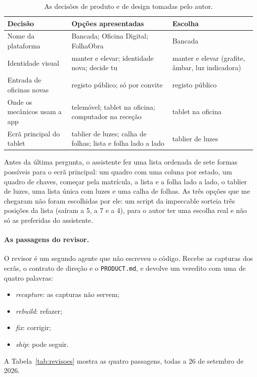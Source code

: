\documentclass[a4paper,12pt]{article}
\begin{document}
\begin{table}[htbp]
\centering
\small
\begin{tabularx}{\textwidth}{@{}>{\raggedright\arraybackslash}p{3.2cm}LL@{}}
\toprule
\textbf{Decisão} & \textbf{Opções apresentadas} & \textbf{Escolha} \\
\midrule
Nome da plataforma & Bancada; Oficina Digital; FolhaObra & Bancada \\
Identidade visual & manter e elevar; identidade nova; decide tu & manter e elevar (grafite, âmbar, luz indicadora) \\
Entrada de oficinas novas & registo público; só por convite & registo público \\
Onde os mecânicos usam a app & telemóvel; tablet na oficina; computador na receção & tablet na oficina \\
Ecrã principal do tablet & tablier de luzes; calha de folhas; lista e folha lado a lado & tablier de luzes \\
\bottomrule
\end{tabularx}
\caption{As decisões de produto e de design tomadas pelo autor.}
\label{tab:decisoes}
\end{table}

Antes da última pergunta, o assistente fez uma lista ordenada de sete formas possíveis para o ecrã principal: um quadro com uma coluna por estado, um quadro de chaves, começar pela matrícula, a lista e a folha lado a lado, o tablier de luzes, uma lista única com luzes e uma calha de folhas. As três opções que me chegaram não foram escolhidas por ele: um script da impeccable sorteia três posições da lista (saíram a 5, a 7 e a 4), para o autor ter uma escolha real e não só as preferidas do assistente.

\paragraph{As passagens do revisor.} O revisor é um segundo agente que não escreveu o código. Recebe as capturas dos ecrãs, o contrato de direção e o \texttt{PRODUCT.md}, e devolve um veredito com uma de quatro palavras:
\begin{itemize}
  \item \textit{recapture}: as capturas não servem;
  \item \textit{rebuild}: refazer;
  \item \textit{fix}: corrigir;
  \item \textit{ship}: pode seguir.
\end{itemize}
A Tabela~\ref{tab:revisoes} mostra as quatro passagens, todas a 26 de setembro de 2026.
\end{document}
